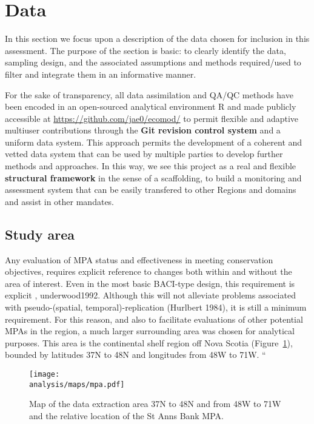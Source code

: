 \documentclass[letterpaper,portrait,11pt]{scrartcl}
\numberwithin{equation}{section}		%
\numberwithin{figure}{section}		%
\numberwithin{table}{section}				%
\newcommand{\ecomod}{\string~/ecomod_data/}   %
\newcommand{\analysis}{\ecomod/mpa/analysis/}   %
\begin{document}
\section{Data} 

In this section we focus upon a description of the data chosen for inclusion in this assessment. The purpose of the section is basic: to clearly identify the data, sampling design, and the associated assumptions and methods required/used to filter and integrate them in an informative manner. 

For the sake of transparency, all data assimilation and QA/QC methods have been encoded in an open-sourced analytical environment R \parencite{rCran} and made publicly accessible at \url{https://github.com/jae0/ecomod/} to permit flexible and adaptive multiuser contributions through the \textbf{Git revision control system} and a uniform  data system. This approach permits the development of a coherent and vetted data system that can be used by multiple parties to develop further methods and approaches. In this way, we see this project as a real and flexible \textbf{structural framework} in the sense of a scaffolding, to build a monitoring and assessment system that can be easily transfered to other Regions and domains and assist in other mandates. 


\subsection{Study area}
Any evaluation of MPA status and effectiveness in meeting conservation objectives, requires explicit reference to changes both within and without the area of interest. Even in the most basic BACI-type design, this requirement is explicit \parencite{green:1979}, underwood1992. Although this will not alleviate problems associated with pseudo-(spatial, temporal)-replication (Hurlbert 1984), it is still a minimum requirement. For this reason, and also to facilitate evaluations of other potential MPAs in the region, a much larger surrounding area was chosen for analytical purposes. This area is the continental shelf region off Nova Scotia (Figure~\ref{fig:SAB}), bounded by latitudes 37N to 48N and longitudes from 48W to 71W.  ``

\begin{figure}[h]
  \caption{Map of the data extraction area 37N to 48N and from 48W to 71W and the relative location of the St Anns Bank MPA.}
  \label{fig:SAB}
  \centering
  \texttt{[image: \\analysis/maps/mpa.pdf]}

\end{figure}
\end{document}
